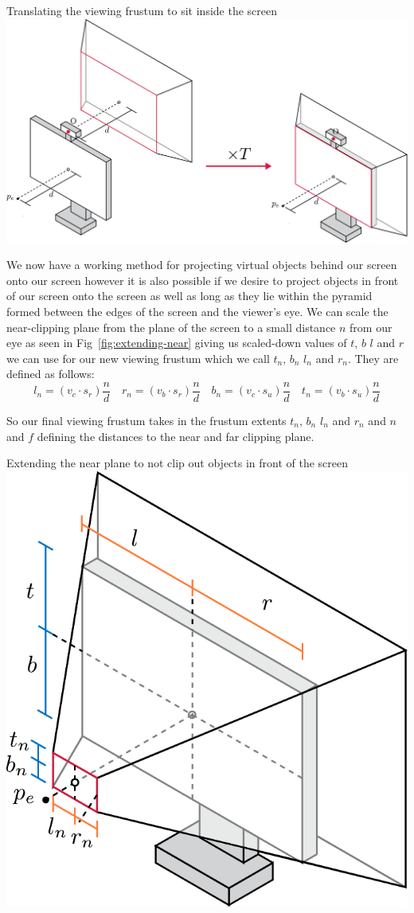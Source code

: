 \begin{figureBox}[label={fig:frust-translation}, width=0.75\linewidth]{Translating the viewing frustum to sit inside the screen}
    \includegraphics[width = 0.8\linewidth]{./background/figures/projection/frust-translation.pdf}
\end{figureBox}

We now have a working method for projecting virtual objects behind our screen onto our screen however it is also possible if we desire to project objects in front of our screen onto the screen as well as long as they lie within the pyramid formed between the edges of the screen and the viewer's eye. We can scale the near-clipping plane from the plane of the screen to a small distance $n$ from our eye as seen in Fig~\ref{fig:extending-near} giving us scaled-down values of $t$, $b$ $l$ and $r$ we can use for our new viewing frustum which we call $t_n$, $b_n$ $l_n$ and $r_n$. They are defined as follows:
\[
    l_n = (v_c \cdot s_r) \frac{n}{d} \quad r_n = (v_b \cdot s_r) \frac{n}{d} \quad b_n = (v_c \cdot s_u) \frac{n}{d} \quad t_n = (v_b \cdot s_u) \frac{n}{d}
\]

So our final viewing frustum takes in the frustum extents $t_n$, $b_n$ $l_n$ and $r_n$ and $n$ and $f$ defining the distances to the near and far clipping plane.
\begin{figureBox}[label={fig:extending-near}, width=0.75\linewidth]{Extending the near plane to not clip out objects in front of the screen}
    \centering
    \includegraphics[width = 0.5\linewidth]{./background/figures/projection/extending-near.pdf}
\end{figureBox}

